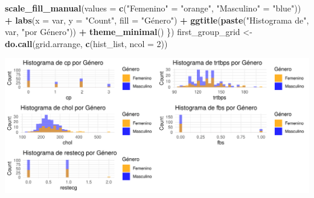 \documentclass[
]{article}
\newenvironment{Shaded}{\begin{snugshade}}{\end{snugshade}}
\newcommand{\AttributeTok}[1]{\textcolor[rgb]{0.13,0.29,0.53}{#1}}
\newcommand{\DecValTok}[1]{\textcolor[rgb]{0.00,0.00,0.81}{#1}}
\newcommand{\FunctionTok}[1]{\textcolor[rgb]{0.13,0.29,0.53}{\textbf{#1}}}
\newcommand{\NormalTok}[1]{#1}
\newcommand{\OtherTok}[1]{\textcolor[rgb]{0.56,0.35,0.01}{#1}}
\newcommand{\SpecialCharTok}[1]{\textcolor[rgb]{0.81,0.36,0.00}{\textbf{#1}}}
\newcommand{\StringTok}[1]{\textcolor[rgb]{0.31,0.60,0.02}{#1}}
\begin{document}
\begin{Shaded}
\begin{Highlighting}[]
    \FunctionTok{scale\_fill\_manual}\NormalTok{(}\AttributeTok{values =} \FunctionTok{c}\NormalTok{(}\StringTok{"Femenino"} \OtherTok{=} \StringTok{"orange"}\NormalTok{, }\StringTok{"Masculino"} \OtherTok{=} \StringTok{"blue"}\NormalTok{)) }\SpecialCharTok{+}
    \FunctionTok{labs}\NormalTok{(}\AttributeTok{x =}\NormalTok{ var, }\AttributeTok{y =} \StringTok{"Count"}\NormalTok{, }\AttributeTok{fill =} \StringTok{"Género"}\NormalTok{) }\SpecialCharTok{+} \FunctionTok{ggtitle}\NormalTok{(}\FunctionTok{paste}\NormalTok{(}\StringTok{"Histograma de"}\NormalTok{, var, }\StringTok{"por Género"}\NormalTok{)) }\SpecialCharTok{+} \FunctionTok{theme\_minimal}\NormalTok{()}
\NormalTok{\}) }
\NormalTok{first\_group\_grid }\OtherTok{\textless{}{-}} \FunctionTok{do.call}\NormalTok{(grid.arrange, }\FunctionTok{c}\NormalTok{(hist\_list, }\AttributeTok{ncol =} \DecValTok{2}\NormalTok{))}
\end{Highlighting}
\end{Shaded}

\includegraphics{coyolaf_ChristianOyola-PRA2_files/figure-latex/unnamed-chunk-18-1.pdf}
\end{document}
